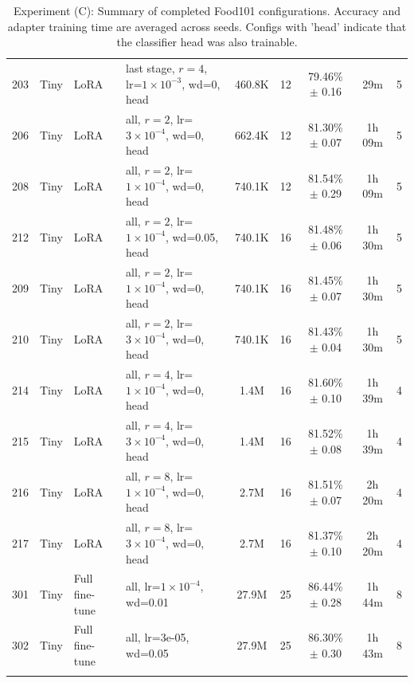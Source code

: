 \begin{longtable}{llllccccc}
203 & Tiny & LoRA & last stage, $r=4$, lr=$1{\times}10^{-3}$, wd=0, head & 460.8K & 12 & 79.46\% $\pm$ 0.16 & 29m & 5 \\
206 & Tiny & LoRA & all, $r=2$, lr=$3{\times}10^{-4}$, wd=0, head & 662.4K & 12 & 81.30\% $\pm$ 0.07 & 1h 09m & 5 \\
208 & Tiny & LoRA & all, $r=2$, lr=$1{\times}10^{-4}$, wd=0, head & 740.1K & 12 & 81.54\% $\pm$ 0.29 & 1h 09m & 5 \\
212 & Tiny & LoRA & all, $r=2$, lr=$1{\times}10^{-4}$, wd=0.05, head & 740.1K & 16 & 81.48\% $\pm$ 0.06 & 1h 30m & 5 \\
209 & Tiny & LoRA & all, $r=2$, lr=$1{\times}10^{-4}$, wd=0, head & 740.1K & 16 & 81.45\% $\pm$ 0.07 & 1h 30m & 5 \\
210 & Tiny & LoRA & all, $r=2$, lr=$3{\times}10^{-4}$, wd=0, head & 740.1K & 16 & 81.43\% $\pm$ 0.04 & 1h 30m & 5 \\
214 & Tiny & LoRA & all, $r=4$, lr=$1{\times}10^{-4}$, wd=0, head & 1.4M & 16 & 81.60\% $\pm$ 0.10 & 1h 39m & 4 \\
215 & Tiny & LoRA & all, $r=4$, lr=$3{\times}10^{-4}$, wd=0, head & 1.4M & 16 & 81.52\% $\pm$ 0.08 & 1h 39m & 4 \\
216 & Tiny & LoRA & all, $r=8$, lr=$1{\times}10^{-4}$, wd=0, head & 2.7M & 16 & 81.51\% $\pm$ 0.07 & 2h 20m & 4 \\
217 & Tiny & LoRA & all, $r=8$, lr=$3{\times}10^{-4}$, wd=0, head & 2.7M & 16 & 81.37\% $\pm$ 0.10 & 2h 20m & 4 \\
301 & Tiny & Full fine-tune & all, lr=$1{\times}10^{-4}$, wd=0.01 & 27.9M & 25 & 86.44\% $\pm$ 0.28 & 1h 44m & 8 \\
302 & Tiny & Full fine-tune & all, lr=3e-05, wd=0.05 & 27.9M & 25 & 86.30\% $\pm$ 0.30 & 1h 43m & 8 \\
\caption{Experiment (C): Summary of completed Food101 configurations. Accuracy and adapter training time are averaged across seeds. Configs with 'head' indicate that the classifier head was also trainable.}
\label{tab:all_combined_run_types_summary}
\end{longtable}
\endgroup

